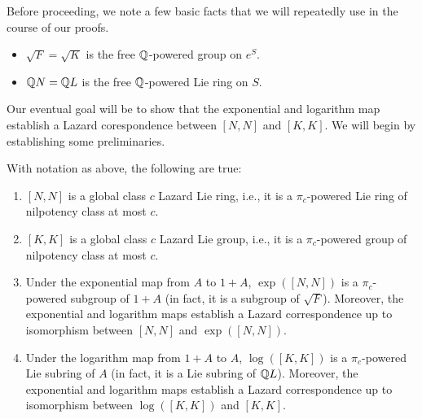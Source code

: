 Before proceeding, we note a few basic facts that we will repeatedly
use in the course of our proofs.

\begin{itemize}
\item $\sqrt{F} = \sqrt{K}$ is the free $\mathbb{Q}$-powered group on $e^S$.
\item $\mathbb{Q} N = \mathbb{Q} L$ is the free $\mathbb{Q}$-powered Lie ring on $S$.
\end{itemize}

Our eventual goal will be to show that the exponential and logarithm
map establish a Lazard corespondence between $[N,N]$ and $[K,K]$. We
will begin by establishing some preliminaries.

\begin{lemma}\label{lemma:lazard-correspondence-derived-setup}
  With notation as above, the following are true:

  \begin{enumerate}
  \item $[N,N]$ is a global class $c$ Lazard Lie ring, i.e., it is a
    $\pi_c$-powered Lie ring of nilpotency class at most $c$.
  \item $[K,K]$ is a global class $c$ Lazard Lie group, i.e., it is a
    $\pi_c$-powered group of nilpotency class at most $c$.
  \item Under the exponential map from $A$ to $1 + A$, $\exp([N,N])$
    is a $\pi_c$-powered subgroup of $1 + A$ (in fact, it is a
    subgroup of $\sqrt{F}$). Moreover, the exponential and logarithm
    maps establish a Lazard correspondence up to isomorphism between
    $[N,N]$ and $\exp([N,N])$.
  \item Under the logarithm map from $1 + A$ to $A$, $\log([K,K])$ is
    a $\pi_c$-powered Lie subring of $A$ (in fact, it is a Lie subring
    of $\mathbb{Q} L$). Moreover, the exponential and logarithm maps
    establish a Lazard correspondence up to isomorphism between
    $\log([K,K])$ and $[K,K]$.
  \end{enumerate}
\end{lemma}

